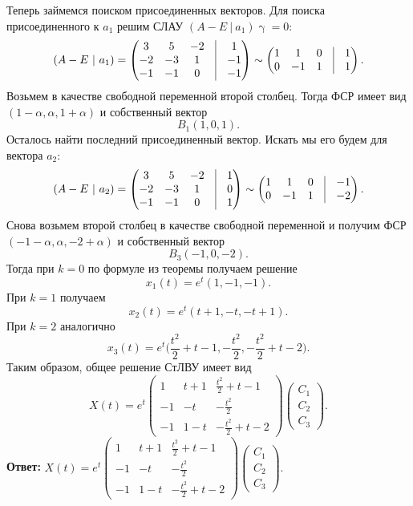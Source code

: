 \documentclass[a4paper, 12pt]{article}
\begin{document}
Теперь займемся поиском присоединенных векторов. Для поиска присоединенного к $a_1$ решим СЛАУ $(A-E\ |\ a_1)\upgamma = 0$:
$$(A-E\ |\ a_1) = \begin{pmatrix}
	3 & 5 & -2 & \vline & 1\\
	-2 & -3 & 1 & \vline & -1\\
	-1 & -1 & 0 & \vline & -1
\end{pmatrix}\sim \begin{pmatrix}
	1 & 1 & 0 & \vline & 1\\
	0 & -1 & 1 & \vline & 1\\
\end{pmatrix}.$$
Возьмем в качестве свободной переменной второй столбец. Тогда ФСР имеет вид $(1 - \alpha, \alpha, 1 + \alpha)$ и собственный вектор $$B_1(1,0,1).$$
Осталось найти последний присоединенный вектор. Искать мы его будем для вектора $a_2$:
$$(A-E\ |\ a_2) = \begin{pmatrix}
	3 & 5 & -2 & \vline & 1\\
	-2 & -3 & 1 & \vline & 0\\
	-1 & -1 & 0 & \vline & 1
\end{pmatrix}\sim\begin{pmatrix}
	1 & 1 & 0 & \vline & -1\\
	0 & -1 & 1 & \vline & -2\\
\end{pmatrix}.$$
Снова возьмем второй столбец в качестве свободной переменной и получим ФСР $(-1-\alpha, \alpha, -2 + \alpha)$ и собственный вектор 
$$B_3(-1, 0, -2).$$
Тогда при $k = 0$ по формуле из теоремы получаем решение
$$x_1(t) = e^{t}(1,-1,-1).$$
При $k =1$ получаем
$$x_2(t) = e^{t}(t + 1,-t,-t + 1).$$
При $k=2$ аналогично
$$x_3(t) = e^{t}\Big(\frac{t^2}{2} + t - 1,-\frac{t^2}{2},-\frac{t^2}{2} + t - 2\Big).$$
Таким образом, общее решение СтЛВУ имеет вид $$X(t) =e^t\begin{pmatrix}
	1 & t+1 & \frac{t^2}{2} + t - 1\\
	-1 & -t & -\frac{t^2}{2}\\
	-1 & 1-t & -\frac{t^2}{2} + t - 2
\end{pmatrix}\begin{pmatrix}
	C_1\\C_2\\C_3
\end{pmatrix}.$$
\textbf{Ответ:} $X(t) =e^t\begin{pmatrix}
	1 & t+1 & \frac{t^2}{2} + t - 1\\
	-1 & -t & -\frac{t^2}{2}\\
	-1 & 1-t & -\frac{t^2}{2} + t - 2
\end{pmatrix}\begin{pmatrix}
	C_1\\C_2\\C_3
\end{pmatrix}.$\\\\
\end{document}
